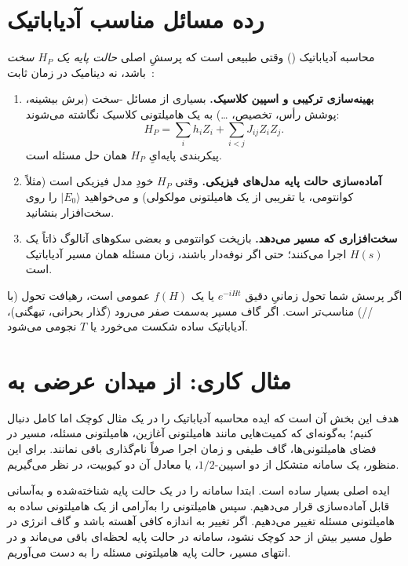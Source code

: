 \section{رده مسائل مناسب آدیاباتیک}

محاسبه آدیاباتیک () وقتی طبیعی است که پرسشِ اصلی \emph{حالت پایه یک $H_P$ سخت} باشد، نه دینامیک در زمان ثابت~\cite{Farhi2000,AlbashLidar2018}:
\begin{enumerate}
	\item \textbf{بهینه‌سازی ترکیبی و اسپین کلاسیک.} بسیاری از مسائل -سخت (برش بیشینه، پوشش رأس، تخصیص، \ldots) به یک هامیلتونی  کلاسیک نگاشته می‌شوند:
	\begin{equation}
		H_P = \sum_{i} h_i Z_i + \sum_{i<j} J_{ij} Z_i Z_j.
	\end{equation}
	پیکربندی پایه‌ایِ $H_P$ همان حل مسئله است.
	\item \textbf{آماده‌سازی حالت پایه مدل‌های فیزیکی.} وقتی $H_P$ خودِ مدل فیزیکی است (مثلاً  کوانتومی، یا تقریبی از یک هامیلتونی مولکولی) و می‌خواهید $\lvert E_0\rangle$ را روی سخت‌افزار بنشانید.
	\item \textbf{سخت‌افزاری که مسیر می‌دهد.} بازپخت کوانتومی و بعضی سکوهای آنالوگ ذاتاً یک $H(s)$ اجرا می‌کنند؛ حتی اگر نوفه‌دار باشند، زبان مسئله همان مسیر آدیاباتیک است.
\end{enumerate}
اگر پرسش شما تحول زمانیِ دقیق $e^{-iH t}$ یا یک $f(H)$ عمومی است، رهیافت تحول (با //) مناسب‌تر است. اگر گاف مسیر به‌سمت صفر می‌رود (گذار بحرانی، تبهگنی)، آدیاباتیک ساده شکست می‌خورد یا $T$ نجومی می‌شود.

\section{مثال کاری: از میدان عرضی به }
\label{sec:adi-ising-example}

هدف این بخش آن است که ایده محاسبه آدیاباتیک را در یک مثال کوچک اما کامل دنبال کنیم؛ به‌گونه‌ای که کمیت‌هایی مانند هامیلتونی آغازین، هامیلتونی مسئله، مسیر در فضای هامیلتونی‌ها، گاف طیفی و زمان اجرا صرفاً نام‌گذاری باقی نمانند. برای این منظور، یک سامانه متشکل از دو اسپین-$1/2$، یا معادل آن دو کیوبیت، در نظر می‌گیریم.

ایده اصلی بسیار ساده است. ابتدا سامانه را در یک حالت پایه شناخته‌شده و به‌آسانی قابل آماده‌سازی قرار می‌دهیم. سپس هامیلتونی را به‌آرامی از یک هامیلتونی ساده به هامیلتونی مسئله تغییر می‌دهیم. اگر تغییر به اندازه کافی آهسته باشد و گاف انرژی در طول مسیر بیش از حد کوچک نشود، سامانه در حالت پایه لحظه‌ای باقی می‌ماند و در انتهای مسیر، حالت پایه هامیلتونی مسئله را به دست می‌آوریم.

